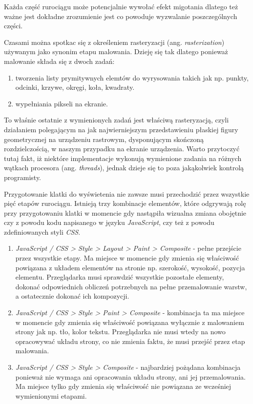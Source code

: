 \documentclass[polish, twoside, 12pt]{mwart}
\begin{document}
Każda część rurociągu może potencjalnie wywołać efekt migotania dlatego też ważne jest dokładne zrozumienie jest co powoduje wyzwalanie poszczególnych części.

Czasami można spotkac się z określeniem rasteryzacji (ang. \emph{rasterization}) używanym jako synonim etapu malowania. Dzieję się tak dlatego ponieważ malowanie składa się z dwoch zadań:

\begin{enumerate}
  \item tworzenia listy prymitywnych elemtów do wyrysowania takich jak np. punkty, odcinki, krzywe, okręgi, koła, kwadraty.
  \item wypełniania pikseli na ekranie.
\end{enumerate}

To właśnie ostatnie z wymienionych zadań jest właściwą rasteryzacją, czyli działaniem polegającym na jak najwierniejszym przedstawieniu płaskiej figury geometrycznej na urządzeniu rastrowym, dysponującym skończoną rozdzielczością, w naszym przypadku na ekranie urządzenia. Warto przytoczyć tutaj fakt, iż niektóre implementacje wykonują wymienione zadania na różnych wątkach procesora (ang. \emph{threads}), jednak dzieje się to poza jakąkolwiek kontrolą programisty.

Przygotowanie klatki do wyświetenia nie zawsze musi przechodzić przez wszystkie pięć etapów rurociągu. Istnieją trzy kombinacje elementów, które odgrywają rolę przy przygotowaniu klatki w momencie gdy nastąpiła wizualna zmiana obojętnie czy z powodu kodu napisanego w języku \emph{JavaScript}, czy też z powodu zdefiniowanych styli \emph{CSS}.

\begin{enumerate}
  \item \emph{JavaScript / CSS > Style > Layout > Paint > Composite} - pełne przejście przez wszystkie etapy. Ma miejsce w momencie gdy zmienia się właściwość powiązana z układem elementów na stronie np. szerokość, wysokość, pozycja elementu. Przeglądarka musi sprawdzić wszystkie pozostałe elementy, dokonać odpowiednich obliczeń potrzebnych na pełne przemalowanie warstw, a ostatecznie dokonać ich kompozycji.
  \item \emph{JavaScript / CSS > Style > Paint > Composite} - kombinacja ta ma miejsce w momencie gdy zmienia się właściwość powiązana wyłącznie z malowaniem strony jak np. tło, kolor tekstu. Przeglądarka nie musi wtedy na nowo opracowywać układu strony, co nie zmienia faktu, że musi przejść przez etap malowania.
  \item \emph{JavaScript / CSS > Style > Composite} - najbardziej pożądana kombinacja ponieważ nie wymaga ani opracowania układu strony, ani jej przemalowania. Ma miejsce tylko gdy zmienia się właściwość nie powiązana ze wcześniej wymienionymi etapami.
\end{enumerate}
\end{document}
